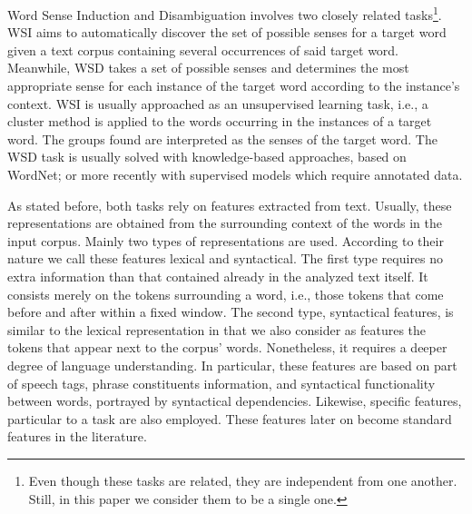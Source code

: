\documentclass{llncs}
\begin{document}
Word Sense Induction and Disambiguation involves two closely related tasks\footnote{Even though these tasks are related, they are independent from one another. Still, in this paper we consider them to be a single one.}. WSI aims to automatically discover the set of possible senses for a target word given a text corpus containing several occurrences of said target word. Meanwhile, WSD takes a set of possible senses and determines the most appropriate sense for each instance of the target word according to the instance's context. WSI is usually approached as an unsupervised learning task, i.e., a cluster method is applied to the words occurring in the instances of a target word. The groups found are interpreted as the senses of the target word. The WSD task is usually solved with knowledge-based approaches, based on WordNet; or more recently with supervised models which require annotated data.

As stated before, both tasks rely on features extracted from text. Usually, these representations are obtained from the surrounding context of the words in the  input corpus. Mainly  two types of representations are used. According to their nature we call these features lexical and syntactical. 	The first type requires no extra information than that contained already in the analyzed text itself. It consists merely on the tokens surrounding a word, i.e., those tokens that come before and after within a fixed window. The second type, syntactical features, is similar to the lexical representation in that we also consider as features the tokens that appear next to the corpus' words. Nonetheless, it requires a deeper degree of language understanding. In particular, these features are based on part of speech tags, phrase constituents information, and syntactical functionality between words, portrayed by syntactical dependencies. Likewise, specific features, particular to a task are also employed. These features later on become standard features in the literature.


\end{document}
